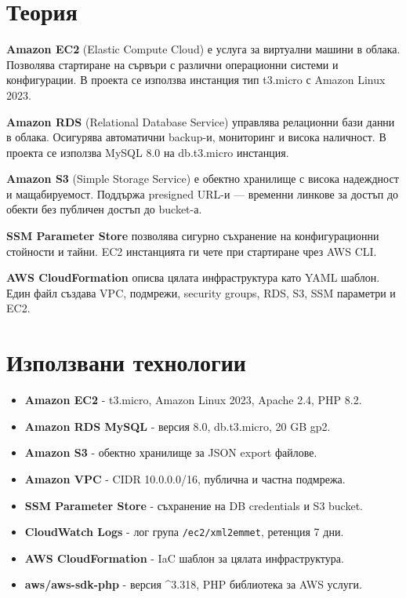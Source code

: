 \documentclass[12pt]{article}
\begin{document}
\section{Теория}

\noindent \textbf{Amazon EC2} (Elastic Compute Cloud) е услуга за виртуални машини в облака. Позволява стартиране на сървъри с различни операционни системи и конфигурации. В проекта се използва инстанция тип t3.micro с Amazon Linux 2023.

\medskip

\noindent \textbf{Amazon RDS} (Relational Database Service) управлява релационни бази данни в облака. Осигурява автоматични backup-и, мониторинг и висока наличност. В проекта се използва MySQL 8.0 на db.t3.micro инстанция.

\medskip

\noindent \textbf{Amazon S3} (Simple Storage Service) е обектно хранилище с висока надеждност и мащабируемост. Поддържа presigned URL-и — временни линкове за достъп до обекти без публичен достъп до bucket-а.

\medskip

\noindent \textbf{SSM Parameter Store} позволява сигурно съхранение на конфигурационни стойности и тайни. EC2 инстанцията ги чете при стартиране чрез AWS CLI.

\medskip

\noindent \textbf{AWS CloudFormation} описва цялата инфраструктура като YAML шаблон. Един файл създава VPC, подмрежи, security groups, RDS, S3, SSM параметри и EC2.


\section{Използвани технологии}

\begin{itemize}
    \item \textbf{Amazon EC2} - t3.micro, Amazon Linux 2023, Apache 2.4, PHP 8.2.

    \item \textbf{Amazon RDS MySQL} - версия 8.0, db.t3.micro, 20 GB gp2.

    \item \textbf{Amazon S3} - обектно хранилище за JSON export файлове.

    \item \textbf{Amazon VPC} - CIDR 10.0.0.0/16, публична и частна подмрежа.

    \item \textbf{SSM Parameter Store} - съхранение на DB credentials и S3 bucket.

    \item \textbf{CloudWatch Logs} - лог група \texttt{/ec2/xml2emmet}, ретенция 7 дни.

    \item \textbf{AWS CloudFormation} - IaC шаблон за цялата инфраструктура.

    \item \textbf{aws/aws-sdk-php} - версия \^{}3.318, PHP библиотека за AWS услуги.
\end{itemize}
\end{document}
